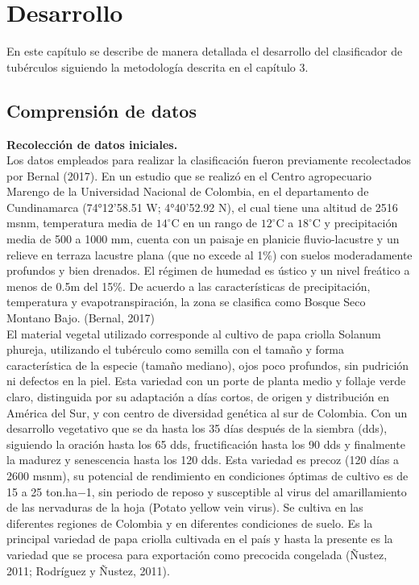 \chapter{Desarrollo}

En este capítulo se describe de manera detallada el desarrollo del clasificador de tubérculos siguiendo la metodología descrita en el capítulo 3.
\noindent
\section{Comprensión de datos}

\noindent
\textbf{Recolección de datos iniciales.}\\

Los datos empleados para realizar la clasificación fueron previamente recolectados por Bernal (2017). En un estudio que se realizó en el Centro agropecuario Marengo de la Universidad Nacional de Colombia, en el departamento de Cundinamarca (74°12'58.51 W; 4°40'52.92 N), el cual tiene una altitud de 2516 msnm, temperatura media de $14^\circ$C  en un rango de $12^\circ$C  a $18^\circ$C  y precipitación media de 500 a 1000 mm, cuenta con un paisaje en planicie fluvio-lacustre y un relieve en terraza lacustre plana (que no excede al 1\%) con suelos moderadamente profundos y bien drenados. El régimen de humedad es ústico y un nivel freático a menos de 0.5m del 15\%. De acuerdo a las características de precipitación, temperatura y evapotranspiración, la zona se clasifica como Bosque Seco Montano Bajo. (Bernal, 2017)\\

El material vegetal utilizado corresponde al cultivo de papa criolla Solanum phureja, utilizando el tubérculo como semilla con el tamaño y forma característica de la especie (tamaño mediano), ojos poco profundos, sin pudrición ni defectos en la piel. Esta variedad con un porte de planta medio y follaje verde claro, distinguida por su adaptación a días cortos, de origen y distribución en América del Sur, y con centro de diversidad genética al sur de Colombia. Con un desarrollo vegetativo que se da hasta los 35 días después de la siembra (dds), siguiendo la oración hasta los 65 dds, fructificación hasta los 90 dds y finalmente la madurez y senescencia hasta los 120 dds. Esta variedad es precoz (120 días a 2600 msnm), su potencial de rendimiento en condiciones óptimas de cultivo es de 15 a 25 ton.ha−1, sin periodo de reposo y susceptible al virus del amarillamiento de las nervaduras de la hoja (Potato yellow vein virus). Se cultiva en las diferentes regiones de Colombia y en diferentes condiciones de suelo. Es la principal variedad de papa criolla cultivada en el país y hasta la presente es la variedad que se procesa para exportación como precocida congelada (Ñustez, 2011; Rodríguez y Ñustez, 2011).\\

